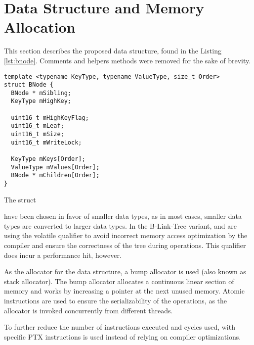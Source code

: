 \section{Data Structure and Memory Allocation}

This section describes the proposed data structure, found in the Listing \ref{lst:bnode}. Comments and helpers methods were removed for the sake of brevity.

\begin{listing}
  \begin{verbatim}
template <typename KeyType, typename ValueType, size_t Order>
struct BNode {
  BNode * mSibling;
  KeyType mHighKey;

  uint16_t mHighKeyFlag;
  uint16_t mLeaf;
  uint16_t mSize;
  uint16_t mWriteLock;

  KeyType mKeys[Order];
  ValueType mValues[Order];
  BNode * mChildren[Order]; 
}
    \end{verbatim}
  \caption{The  struct}\label{lst:bnode}
\end{listing}

 have been chosen in favor of smaller data types, as in most cases, smaller data types are converted to larger data types. In the B-Link-Tree variant,  and  are using the volatile qualifier to avoid incorrect memory access optimization by the compiler and ensure the correctness of the tree during operations. This qualifier does incur a performance hit, however.

As the allocator for the data structure, a bump allocator is used (also known as stack allocator). The bump allocator allocates a continuous linear section of memory and works by increasing a pointer at the next unused memory. Atomic instructions are used to ensure the serializability of the operations, as the allocator is invoked concurrently from different threads.

To further reduce the number of instructions executed and cycles used,  with specific PTX instructions is used instead of relying on compiler optimizations.